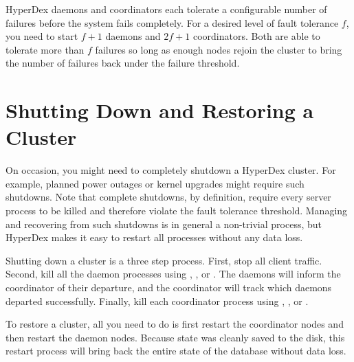 HyperDex daemons and coordinators each tolerate a configurable number of
failures before the system fails completely.  For a desired level of fault
tolerance $f$, you need to start $f + 1$ daemons and $2 f + 1$ coordinators.
Both are able to tolerate more than $f$ failures so long as enough nodes rejoin
the cluster to bring the number of failures back under the failure threshold.

\section{Shutting Down and Restoring a Cluster}

On occasion, you might need to completely shutdown a HyperDex cluster.  For
example, planned power outages or kernel upgrades might require such shutdowns.
Note that complete shutdowns, by definition, require every server process to be
killed and therefore violate the fault tolerance threshold.  Managing and
recovering from such shutdowns is in general a non-trivial process, but HyperDex
makes it easy to restart all processes without any data loss.

Shutting down a cluster is a three step process.  First, stop all client
traffic.  Second, kill all the daemon processes using ,
, or .  The daemons will inform the coordinator of
their departure, and the coordinator will track which daemons departed
successfully.  Finally, kill each coordinator process using ,
, or .

To restore a cluster, all you need to do is first restart the coordinator nodes
and then restart the daemon nodes.  Because state was cleanly saved to the disk,
this restart process will bring back the entire state of the database without
data loss.
